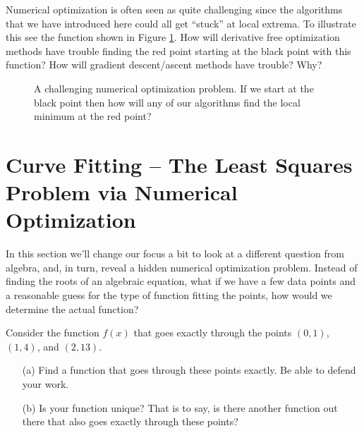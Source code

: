 \begin{problem}
    Numerical optimization is often seen as quite challenging since the algorithms that
    we have introduced here could all get ``stuck'' at local extrema.  To illustrate this
    see the function shown in Figure \ref{fig:num_opt_challenging}.  How will derivative
    free optimization methods have trouble finding the red point starting at the black
    point with this function?  How will gradient
    descent/ascent methods have trouble?  Why?
\end{problem}

\begin{figure}
    \begin{center}
    \end{center}
    \caption{A challenging numerical optimization problem. If we start at the black point
    then how will any of our algorithms find the local minimum at the red point?}
    \label{fig:num_opt_challenging}
\end{figure}



\newpage\section{Curve Fitting -- The Least Squares Problem via Numerical Optimization}
In this section we'll change our focus a bit to look at a different question from algebra,
and, in turn, reveal a hidden numerical optimization problem.
Instead of finding the roots of an algebraic equation, what if we have a few data points
and a reasonable guess for the type of function fitting the points, how would we determine
the actual function?  

\begin{problem}
    Consider the function $f(x)$ that goes exactly through the points $(0,1)$, $(1,4)$,
    and $(2,13)$.  
    \begin{enumerate}
        \item[(a)] Find a function that goes through these points exactly.  Be able to
            defend your work.
        \item[(b)] Is your function unique?  That is to say, is there another function out
            there that also goes exactly through these points?  
    \end{enumerate}
\end{problem}

